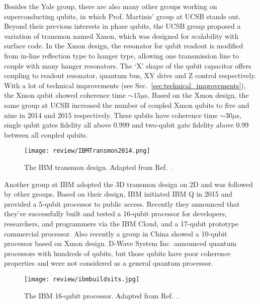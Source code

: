 Besides the Yale group, there are also many other groups working on superconducting qubits, in which Prof. Martinis' group at UCSB stands out. Beyond their previous interests in phase qubits, the UCSB group proposed a variation of transmon named Xmon\cite{Barends2013Coherent}, which was designed for scalability with surface code\cite{Fowler2012}. In the Xmon design, the resonator for qubit readout is modified from in-line reflection type to hanger type, allowing one transmission line to couple with many hanger resonators. The `X' shape of the qubit capacitor offers coupling to readout resonator, quantum bus, XY drive and Z control respectively. With a lot of technical improvements (see Sec.~\ref{sec:technical_improvements}), the Xmon qubit showed coherence time $\sim 15\mu$s. Based on the Xmon design, the same group at UCSB increased the number of coupled Xmon qubits to five\cite{Barends2014} and nine\cite{Kelly2015} in 2014 and 2015 respectively. These qubits have coherence time $\sim 30\mu$s, single qubit gates fidelity all above 0.999 and two-qubit gate fidelity above 0.99 between all coupled qubits.


            \begin{figure}[h]
                \centering
                \texttt{[image: review/IBMTransmon2014.png]}
                \caption{The IBM transmon design. Adapted from Ref.~.}
                \label{fig:IBMTransmon2014}
            \end{figure}


Another group at IBM adopted the 3D transmon design on 2D\cite{Chow2014,Takita2017} and was followed by other groups\cite{Mlynek2014,Pechal2016,Walter2017}. Based on their design, IBM initiated IBM Q in 2015 and provided a 5-qubit processor to public access\cite{IBMQ}. Recently they announced that they've successfully built and tested a 16-qubit processor for developers, researchers, and programmers via the IBM Cloud, and a 17-qubit prototype commercial processor\cite{IBM16QubitsOriginal}. Also recently a group in China showed a 10-qubit processor based on Xmon design\cite{Song2017}. D-Wave System Inc. announced quantum processors with hundreds of qubits\cite{Shin2014}, but those qubits have poor coherence properties and were not considered as a general quantum processor\cite{devoret2013superconducting}.



            \begin{figure}[h]
                \centering
                \texttt{[image: review/ibmbuildsits.jpg]}
                \caption{The IBM 16-qubit processor. Adapted from Ref.~.}
                \label{fig:ibmbuildsits}
            \end{figure}



